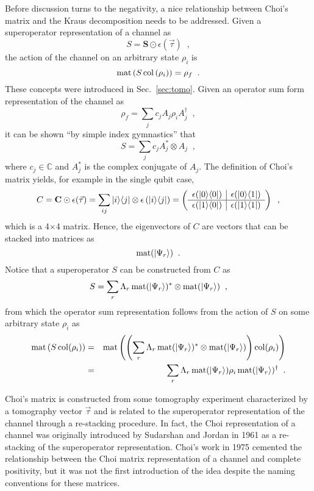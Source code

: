Before discussion turns to the negativity, a nice relationship between Choi's matrix and the Kraus decomposition needs to be addressed.  Given a superoperator representation of a channel as
$$
S = \mathbf{S}\odot\epsilon(\vec{\tau})\;\;,
$$
the action of the channel on an arbitrary state $\rho_i$ is
$$
\operatorname{mat}\left(S\operatorname{col}\left(\rho_i\right)\right) = \rho_f\;\;.
$$
These concepts were introduced in Sec.\ \ref{sec:tomo}.  Given an operator sum form representation of the channel as
$$
\rho_f = \sum_j c_j A_j \rho_i A_j^\dagger\;\;,
$$
it can be shown ``by simple index gymnastics'' \cite{Havel2003} that
$$
S = \sum_j c_j A_j^*\otimes A_j\;\;,    
$$
where $c_j\in\mathbb{C}$ and $A_j^*$ is the complex conjugate of $A_j$.  The definition of Choi's matrix yields, for example in the single qubit case,
$$
C = \mathbf{C}\odot\epsilon(\vec{\tau}) =  \sum_{ij} |i\rangle\langle j| \otimes \epsilon\left( |i\rangle\langle j| \right) = \left(\begin{array}
{c|c} \epsilon(|0\rangle\langle0|)&\epsilon(|0\rangle\langle1|)\\
\hline
\epsilon(|1\rangle\langle0|)&\epsilon(|1\rangle\langle1|)
\end{array}\right)\;\;,
$$
which is a 4$\times $4 matrix.  Hence, the eigenvectors of $C$ are vectors that can be stacked into matrices as
$$
\operatorname{mat}(\left|\Psi_r\right\rangle)\;\;.
$$
Notice that a superoperator $S$ can be constructed from $C$ as \cite{Havel2003}
$$
S = \sum_r \Lambda_r \operatorname{mat}(\left|\Psi_r\right\rangle)^*\otimes \operatorname{mat}(\left|\Psi_r\right\rangle)\;\;,
$$
from which the operator sum representation follows from the action of $S$ on some arbitrary state $\rho_i$ as
\begin{eqnarray*}
\operatorname{mat}\left(S\operatorname{col}(\rho_i)\right) &=& \operatorname{mat}\left(\left(\sum_r \Lambda_r \operatorname{mat}(\left|\Psi_r\right\rangle)^*\otimes \operatorname{mat}(\left|\Psi_r\right\rangle)\right)\operatorname{col}(\rho_i)\right)\\
 &=& \sum_r \Lambda_r \operatorname{mat}(\left|\Psi_r\right\rangle)\rho_i \operatorname{mat}(\left|\Psi_r\right\rangle)^\dagger\;\;.
\end{eqnarray*}

Choi's matrix is constructed from some tomography experiment characterized by a tomography vector $\vec{\tau}$ and is related to the superoperator representation of the channel through a re-stacking procedure.  In fact, the Choi representation of a channel was originally introduced by Sudarshan and Jordan in 1961 \cite{Sudarshan1961} as a re-stacking of the superoperator representation.  Choi's work in 1975 \cite{Choi1975} cemented the relationship between the Choi matrix representation of a channel and complete positivity, but it was not the first introduction of the idea despite the naming conventions for these matrices.

